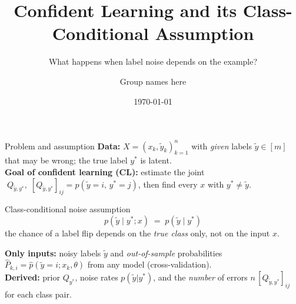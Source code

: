 \documentclass[aspectratio=169,10pt]{beamer}
\title[Confident learning under instance-dependent noise]{Confident Learning and its Class-Conditional Assumption}
\subtitle{What happens when label noise depends on the example?}
\author{Group names here}
\institute{Machine Learning course project}
\date{\today}
\newcommand{\Qyy}{Q_{\tilde y,y^*}}
\begin{document}
\begin{frame}
  \titlepage
\end{frame}

\begin{frame}{Problem and assumption}
  \textbf{Data:} $X=(x_k,\tilde y_k)_{k=1}^n$ with \emph{given} labels $\tilde y\in[m]$ that may be wrong; the true label $y^*$ is latent.\\[4pt]
  \textbf{Goal of confident learning (CL):} estimate the joint $\;\Qyy,\;[\Qyy]_{ij}=p(\tilde y=i,\,y^*=j)$, then find every $x$ with $y^*\neq\tilde y$.\\[6pt]
  \begin{block}{Class-conditional noise assumption}
    \[
      p(\tilde y\mid y^*;x)\;=\;p(\tilde y\mid y^*)
    \]
    the chance of a label flip depends on the \emph{true class} only, not on the input $x$.
  \end{block}
  \textbf{Only inputs:} noisy labels $\tilde y$ and \emph{out-of-sample} probabilities $\hat P_{k,i}=\hat p(\tilde y=i;x_k,\theta)$ from any model (cross-validation).\\
  \textbf{Derived:} prior $Q_{y^*}$, noise rates $p(\tilde y|y^*)$, and the \emph{number} of errors $n\,[\Qyy]_{ij}$ for each class pair.
\end{frame}
\end{document}
